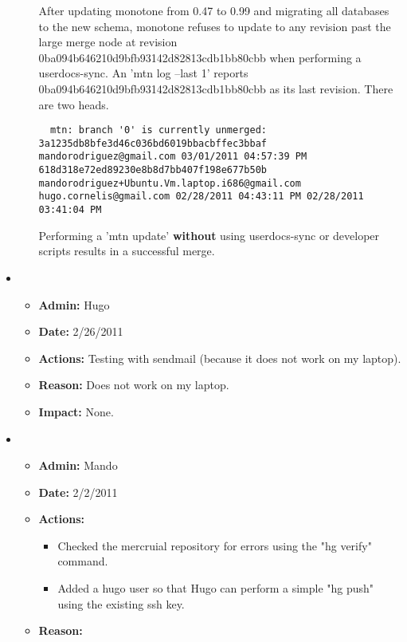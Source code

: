 \documentclass[12pt]{article}
\begin{document}
\begin{itemize}
\begin{itemize}
   After updating monotone from 0.47 to 0.99 and migrating all databases to the new schema, monotone refuses to update to any revision past 
   the large merge node at revision 0ba094b646210d9bfb93142d82813cdb1bb80cbb when performing a userdocs-sync. An 'mtn log --last 1' reports 0ba094b646210d9bfb93142d82813cdb1bb80cbb as its last revision. There are two heads.
   
  \begin{verbatim}
  mtn: branch '0' is currently unmerged:
3a1235db8bfe3d46c036bd6019bbacbffec3bbaf mandorodriguez@gmail.com 03/01/2011 04:57:39 PM
618d318e72ed89230e8b8d7bb407f198e677b50b mandorodriguez+Ubuntu.Vm.laptop.i686@gmail.com hugo.cornelis@gmail.com 02/28/2011 04:43:11 PM 02/28/2011 03:41:04 PM
  \end{verbatim}
  
  Performing a 'mtn update' {\bf without} using userdocs-sync or developer scripts results in a successful merge. 
  
  
  \end{itemize}


\item
  \begin{itemize}
  \item[] {\bf Admin:} Hugo
  \item[] {\bf Date:} 2/26/2011 
  \item[] {\bf Actions:} Testing with sendmail (because it does not work on my laptop).
  \item[] {\bf Reason:} Does not work on my laptop.
  \item[] {\bf Impact:} None.
  \end{itemize}

\item
\begin{itemize}
\item[] {\bf Admin:} Mando
\item[] {\bf Date:} 2/2/2011 
\item[] {\bf Actions:}  

  \begin{itemize}
  \item[] Checked the mercruial repository for errors using the "hg verify" command. 
  \item[] Added a hugo user so that Hugo can perform a simple "hg push" using the existing ssh key.
  \end{itemize}

\item[] {\bf Reason:} 


\end{itemize}
\end{itemize}
\end{document}
